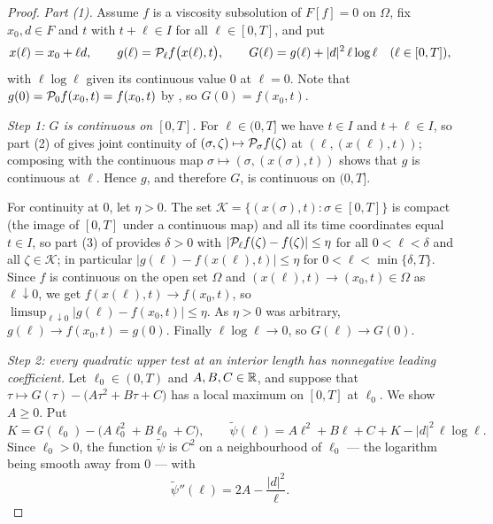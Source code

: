 \begin{proof}
\emph{Part (1).}
Assume $f$ is a viscosity subsolution of $F[f]=0$ on $\Omega$, fix $x_0,d\in F$
and $t$ with $t+\ell\in I$ for all $\ell\in[0,T]$, and put
\[
  x(\ell)=x_0+\ell d,\qquad g(\ell)=\mathcal{P}_\ell f\bigl(x(\ell),t\bigr),
  \qquad G(\ell)=g(\ell)+|d|^2\,\ell\log\ell\quad(\ell\in[0,T]),
\]
with $\ell\log\ell$ given its continuous value $0$ at $\ell=0$. Note that
$g(0)=\mathcal{P}_0f(x_0,t)=f(x_0,t)$ by , so $G(0)=f(x_0,t)$.

\emph{Step 1: $G$ is continuous on $[0,T]$.}
For $\ell\in(0,T]$ we have $t\in I$ and $t+\ell\in I$, so part (2) of
 gives joint continuity of
$(\sigma,\zeta)\mapsto\mathcal{P}_\sigma f(\zeta)$ at $(\ell,(x(\ell),t))$; composing
with the continuous map $\sigma\mapsto(\sigma,(x(\sigma),t))$ shows that $g$ is
continuous at $\ell$. Hence $g$, and therefore $G$, is continuous on $(0,T]$.

For continuity at $0$, let $\eta>0$. The set
$\mathcal K=\{(x(\sigma),t):\sigma\in[0,T]\}$ is compact (the image of $[0,T]$
under a continuous map) and all its time coordinates equal $t\in I$, so part (3)
of  provides $\delta>0$ with
$|\mathcal{P}_\ell f(\zeta)-f(\zeta)|\le\eta$ for all $0<\ell<\delta$ and all
$\zeta\in\mathcal K$; in particular
$|g(\ell)-f(x(\ell),t)|\le\eta$ for $0<\ell<\min\{\delta,T\}$. Since $f$ is
continuous on the open set $\Omega$ and $(x(\ell),t)\to(x_0,t)\in\Omega$ as
$\ell\downarrow0$, we get $f(x(\ell),t)\to f(x_0,t)$, so
$\limsup_{\ell\downarrow0}|g(\ell)-f(x_0,t)|\le\eta$. As $\eta>0$ was
arbitrary, $g(\ell)\to f(x_0,t)=g(0)$. Finally $\ell\log\ell\to0$, so
$G(\ell)\to G(0)$.

\emph{Step 2: every quadratic upper test at an interior length has nonnegative
leading coefficient.}
Let $\ell_0\in(0,T)$ and $A,B,C\in\mathbb{R}$, and suppose that
$\tau\mapsto G(\tau)-\bigl(A\tau^2+B\tau+C\bigr)$ has a local maximum on $[0,T]$ at
$\ell_0$. We show $A\ge0$. Put
\[
  K=G(\ell_0)-\bigl(A\ell_0^2+B\ell_0+C\bigr),\qquad
  \widetilde\psi(\ell)=A\ell^2+B\ell+C+K-|d|^2\,\ell\log\ell .
\]
Since $\ell_0>0$, the function $\widetilde\psi$ is $C^2$ on a neighbourhood of
$\ell_0$ — the logarithm being smooth away from $0$ — with
\begin{equation}\label{eq:qpc-second}
  \widetilde\psi''(\ell)=2A-\frac{|d|^2}{\ell}.
\end{equation}


\end{proof}
